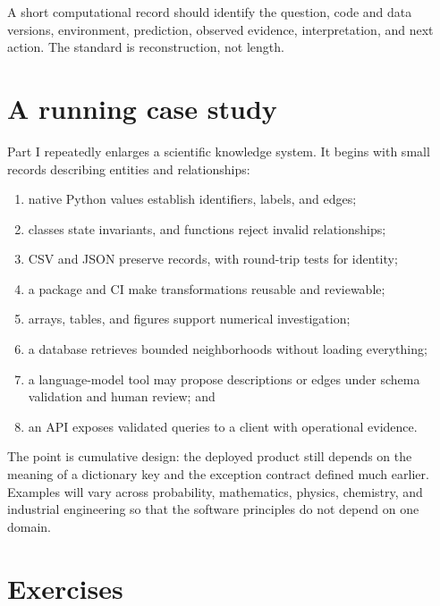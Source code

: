 A short computational record should identify the question, code and data
versions, environment, prediction, observed evidence, interpretation, and next
action. The standard is reconstruction, not length.


\section{A running case study}

Part I repeatedly enlarges a scientific knowledge system. It begins with small
records describing entities and relationships:

\begin{enumerate}
  \item native Python values establish identifiers, labels, and edges;
  \item classes state invariants, and functions reject invalid relationships;
  \item CSV and JSON preserve records, with round-trip tests for identity;
  \item a package and CI make transformations reusable and reviewable;
  \item arrays, tables, and figures support numerical investigation;
  \item a database retrieves bounded neighborhoods without loading everything;
  \item a language-model tool may propose descriptions or edges under schema
  validation and human review; and
  \item an API exposes validated queries to a client with operational evidence.
\end{enumerate}

The point is cumulative design: the deployed product still depends on the
meaning of a dictionary key and the exception contract defined much earlier.
Examples will vary across probability, mathematics, physics, chemistry, and
industrial engineering so that the software principles do not depend on one
domain.


\newpage
\section{Exercises}


